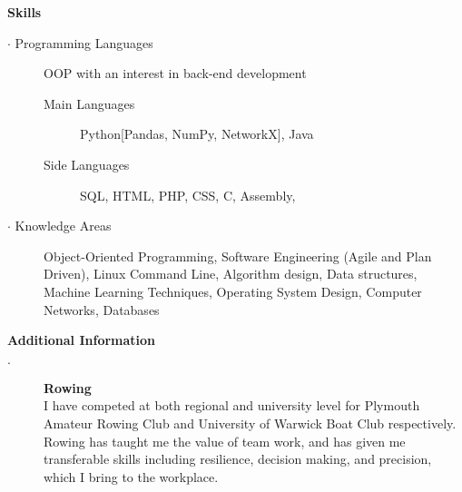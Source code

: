 \documentclass[12pt, a4paper]{article}
\begin{document}
\textbf{Skills}
  \begin{description}
    \item[$\cdot$ Programming Languages] OOP with an interest in back-end development
    \begin{description}
      \item[Main Languages] Python[Pandas, NumPy, NetworkX], Java
      \item[Side Languages] SQL, HTML, PHP, CSS, C, Assembly,
    \end{description}
    \item[$\cdot$ Knowledge Areas] Object-Oriented Programming, Software Engineering (Agile and Plan Driven), Linux Command Line, Algorithm design, Data structures, Machine Learning Techniques, Operating System Design, Computer Networks, Databases
  \end{description}
\bigskip

  \textbf{Additional Information}
    \begin{description}
      \item[$\cdot$] \textbf{Rowing} \\I have competed at both regional and university level for Plymouth Amateur Rowing Club and University of Warwick Boat Club respectively. Rowing has taught me the value of team work, and has given me transferable skills including resilience, decision making, and precision, which I bring to the workplace.

      \iffalse
      Time management $\cdot$ Team work $\cdot$ Resilience $\cdot$ Motivational skills $\cdot$ Quick thinking \\ $\cdot$ Technical planning $\cdot$ Precision
      \fi
    \end{description}
\end{document}
